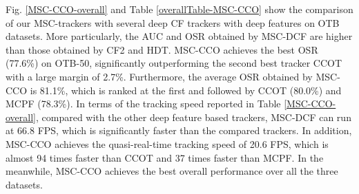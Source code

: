 \documentclass[runningheads]{llncs}
\begin{document}
Fig. \ref{MSC-CCO-overall} and Table \ref{overallTable-MSC-CCO} show the comparison of our MSC-trackers with several deep CF trackers with deep features on OTB datasets. More particularly, the AUC and OSR obtained by MSC-DCF are higher than those obtained by CF2 and HDT. MSC-CCO achieves the best OSR (77.6\%) on OTB-50, significantly outperforming the second best tracker CCOT with a large margin of 2.7\%. Furthermore, the average OSR obtained by MSC-CCO is 81.1\%, which is ranked at the first and followed by CCOT (80.0\%) and MCPF (78.3\%).  In terms of the tracking speed reported in Table \ref{MSC-CCO-overall}, compared with the other deep feature based trackers, MSC-DCF can run at 66.8 FPS, which is significantly faster than the compared trackers. In addition, MSC-CCO achieves the quasi-real-time tracking speed of 20.6 FPS, which is almost 94 times faster than CCOT and 37 times faster than MCPF. In the meanwhile, MSC-CCO achieves the best overall performance over all the three datasets. %


\end{document}
